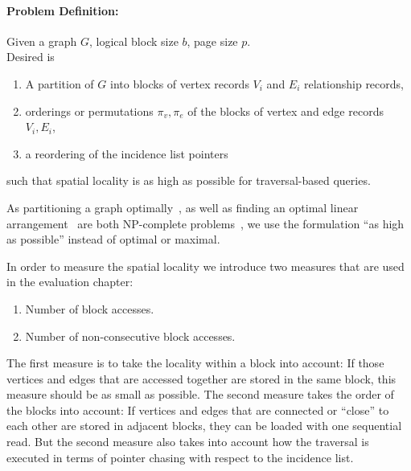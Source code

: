     \paragraph{Problem Definition:} Given a graph $G$, logical block size $b$, page size $p$. \\
    Desired is 
    \begin{enumerate}
     \item A partition of $G$ into blocks of vertex records $V_i$ and $E_i$ relationship records, 
     \item orderings or permutations $\pi_v, \pi_e$ of the blocks of vertex and edge records $V_i, E_i$,
     \item a reordering of the incidence list pointers
    \end{enumerate}
    such that spatial locality is as high as possible for traversal-based queries.
    
    As partitioning a graph optimally~\autocite{andreev2006balanced}, as well as finding an optimal linear arrangement~\autocite{garey1974some} are both NP-complete problems~\autocite{lewis1983computers}, we use the formulation ``as high as possible'' instead of optimal or maximal.
    
    In order to measure the spatial locality we introduce two measures that are used in the evaluation chapter:
    \begin{enumerate}
     \item Number of block accesses.
     \item Number of non-consecutive block accesses.
    \end{enumerate}
    The first measure is to take the locality within a block into account:
    If those vertices and edges that are accessed together are stored in the same block, this measure should be as small as possible.
    The second measure takes the order of the blocks into account: 
    If vertices and edges that are connected or ``close'' to each other are stored in adjacent blocks, they can be loaded with one sequential read.
    But the second measure also takes into account how the traversal is executed in terms of pointer chasing with respect to the incidence list.
    
